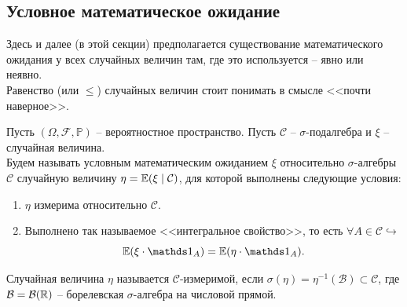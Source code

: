 \subsection{Условное математическое ожидание}
\begin{note}
    Здесь и далее (в этой секции) предполагается существование математического ожидания у всех случайных величин там, где это используется -- явно или неявно. \\
    Равенство (или $\leq$) случайных величин стоит понимать в смысле <<почти наверное>>.
\end{note}
\begin{definition}
    Пусть $(\Omega, \mathcal{F}, \mathbb{P})$  --  вероятностное пространство. Пусть $\mathcal{C}$ -- $\sigma$-подалгебра и $\xi$ -- случайная величина. \\
    Будем называть условным математическим ожиданием $\xi$ относительно $\sigma$-алгебры $\mathcal{C}$ случайную величину $\eta = \mathbb{E}(\xi \mid \mathcal{C})$, для которой выполнены следующие условия:
    \begin{enumerate}
        \item $\eta$ измерима относительно $\mathcal{C}$.
        \item Выполнено так называемое <<интегральное свойство>>, то есть $\forall A \in \mathcal{C} \hookrightarrow$
        \[
            \Ex(\xi \cdot \Ind_{A}) = \Ex(\eta \cdot \Ind_A).
        \]
    \end{enumerate}
\end{definition}
\begin{reminder}
    Случайная величина $\eta$ называется $\mathcal{C}$-измеримой, если $\sigma(\eta) = \eta^{-1}(\mathcal{B}) \subset \mathcal{C}$, где $\mathcal{B} = \mathcal{B}(\mathbb{R})$ -- борелевская $\sigma$-алгебра на числовой прямой.
\end{reminder}

